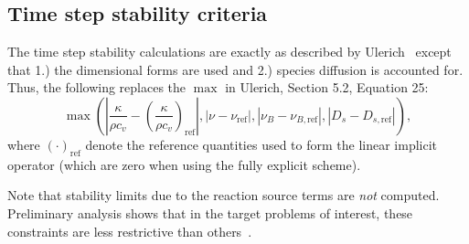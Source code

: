 \subsection{Time step stability criteria}
\label{sec:stabilitycriteria}
The time step stability calculations are exactly as described by
Ulerich~\cite{} except that 1.) the dimensional forms are used and 2.)
species diffusion is accounted for.  Thus, the following replaces the
$\max$ in Ulerich, Section 5.2, Equation 25:
%
\begin{equation*}
\max \left(
        \left|\frac{\kappa}{\rho c_v} - \left( \frac{\kappa}{\rho c_v} \right)_{\mathrm{ref}} \right|,
        \left|\nu-\nu_{\mathrm{ref}} \right|,
        \left|\nu_{B}-\nu_{B,\mathrm{ref}}\right|,
        \left|D_s-D_{s,\mathrm{ref}}\right|
     \right),
\end{equation*}
% 
where $(\cdot)_{\mathrm{ref}}$ denote the reference quantities used
to form the linear implicit operator (which are zero when using the
fully explicit scheme).

Note that stability limits due to the reaction source terms are
\emph{not} computed.  Preliminary analysis shows that in the target
problems of interest, these constraints are less restrictive than
others~\cite{}.

